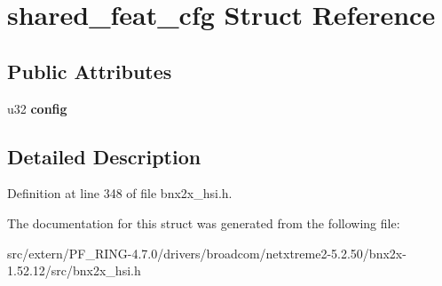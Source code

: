 \hypertarget{structshared__feat__cfg}{
\section{shared\_\-feat\_\-cfg Struct Reference}
\label{structshared__feat__cfg}
}
\subsection*{Public Attributes}
\begin{DoxyCompactItemize}
\item 
\hypertarget{structshared__feat__cfg_a5905fc8e932c16a56c82618f95171a86}{
u32 {\bfseries config}}
\label{structshared__feat__cfg_a5905fc8e932c16a56c82618f95171a86}

\end{DoxyCompactItemize}


\subsection{Detailed Description}


Definition at line 348 of file bnx2x\_\-hsi.h.



The documentation for this struct was generated from the following file:\begin{DoxyCompactItemize}
\item 
src/extern/PF\_\-RING-\/4.7.0/drivers/broadcom/netxtreme2-\/5.2.50/bnx2x-\/1.52.12/src/bnx2x\_\-hsi.h\end{DoxyCompactItemize}
